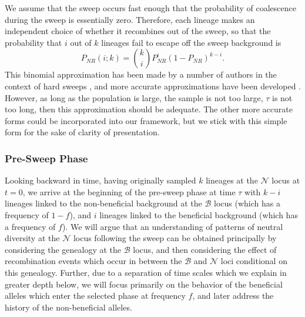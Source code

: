 \documentclass[a4paper,10pt]{article}
\newcommand{\fancyN}{$\mathcal N$ }
\newcommand{\fancyB}{$\mathcal B$ }
\begin{document}
We assume that the sweep occurs fast enough that the probability of coalescence during the sweep is essentially zero. Therefore, each lineage makes an independent choice of whether it recombines out of the sweep, so that the probability that $i$ out of $k$ lineages fail to escape off the sweep background is
\begin{equation}
P_{NR}(i;k) = {k \choose i} P_{NR}^{i} (1-P_{NR})^{k-i}.
\end{equation}
This binomial approximation has been made by a number of authors in the context of hard sweeps \citep{Barton}, and more accurate approximations have been developed \citep{Etheridge2006}. However, as long as the population is large, the sample is not too large,  $\tau$ is not too long, then this approximation should be adequate. The other more accurate forms could be incorporated into our framework, but we stick with this simple form for the sake of clarity of presentation.




\subsubsection{Pre-Sweep Phase}
Looking backward in time, having originally sampled $k$ lineages at the \fancyN locus at $t=0$, we arrive at the beginning of the pre-sweep phase at time $\tau$ with $k-i$ lineages linked to the non-beneficial background at the \fancyB locus (which has a frequency of $1-f$), and $i$ lineages linked to the beneficial background (which has a frequency of $f$). We will argue that an understanding of patterns of neutral diversity at the \fancyN locus following the sweep can be obtained principally by considering the genealogy at the \fancyB locus, and then considering the effect of recombination events which occur in between the \fancyB and \fancyN loci conditional on this genealogy. Further, due to a separation of time scales which we explain in greater depth below, we will focus primarily on the behavior of the beneficial alleles which enter the selected phase at frequency $f$, and later address the history of the non-beneficial alleles.
\end{document}
